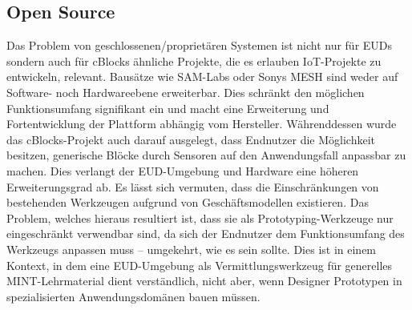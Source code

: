 \subsection{Open Source}
Das Problem von geschlossenen/proprietären Systemen ist nicht nur für \acp{EUD} sondern auch für cBlocks ähnliche Projekte, die es erlauben \ac{IoT}-Projekte zu entwickeln, relevant. Bausätze wie SAM-Labs oder Sonys MESH sind weder auf Software- noch Hardwareebene erweiterbar. Dies schränkt den möglichen Funktionsumfang signifikant ein und macht eine Erweiterung und Fortentwicklung der Plattform abhängig vom Hersteller. Währenddessen wurde das cBlocks-Projekt auch darauf ausgelegt, dass Endnutzer die Möglichkeit besitzen, generische Blöcke durch Sensoren auf den Anwendungsfall anpassbar zu machen. Dies verlangt der \ac{EUD}-Umgebung und Hardware eine höheren Erweiterungsgrad ab. Es lässt sich vermuten, dass die Einschränkungen von bestehenden Werkzeugen aufgrund von Geschäftsmodellen existieren. Das Problem, welches hieraus resultiert ist, dass sie als Prototyping-Werkzeuge nur eingeschränkt verwendbar sind, da sich der Endnutzer dem Funktionsumfang des Werkzeugs anpassen muss -- umgekehrt, wie es sein sollte. Dies ist in einem Kontext, in dem eine \ac{EUD}-Umgebung als Vermittlungswerkzeug für generelles MINT-Lehrmaterial dient verständlich, nicht aber, wenn Designer Prototypen in spezialisierten Anwendungsdomänen bauen müssen.

